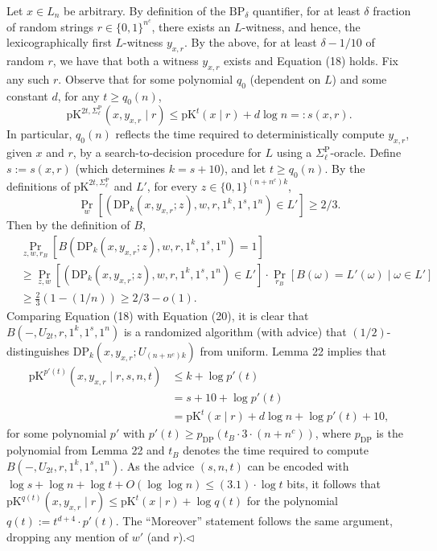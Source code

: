 \documentclass[10pt,a4paper]{article}
\begin{document}
Let $x\in L_n$ be arbitrary. By definition of the $\mathrm{BP}_\delta$ quantifier, for at least $\delta$ fraction of random strings $r\in\{0,1\}^{n^c}$, there exists an $L$-witness, and hence, the lexicographically first $L$-witness $y_{x,r}$. By the above, for at least $\delta-1/10$ of random $r$, we have that both a witness $y_{x,r}$ exists and Equation (18) holds. Fix any such $r$.
Observe that for some polynomial $q_0$ (dependent on $L$) and some constant $d$, for any $t\geq q_0(n)$,
\[\mathrm{pK}^{2t,\Sigma_\ell^{\mathrm P}}(x,y_{x,r}\mid r)\leq\mathrm{pK}^t(x\mid r)+d\log n=:s(x,r).\tag{19}\]
In particular, $q_0(n)$ reflects the time required to deterministically compute $y_{x,r}$, given $x$ and $r$, by a search-to-decision procedure for $L$ using a $\Sigma_\ell^{\mathrm P}$-oracle.
Define $s:=s(x,r)$ (which determines $k=s+10$), and let $t\geq q_0(n)$. By the definitions of $\mathrm{pK}^{2t,\Sigma_\ell^{\mathrm P}}$ and $L'$, for every $z\in\{0,1\}^{(n+n^c)k}$,
\[\Pr_w[(\mathrm{DP}_k(x,y_{x,r};z),w,r,1^k,1^s,1^n)\in L']\geq2/3.\]
Then by the definition of $B$,
\begin{align*}
&\Pr_{z,w,r_B}[B(\mathrm{DP}_k(x,y_{x,r};z),w,r,1^k,1^s,1^n)=1]\\
&\geq\Pr_{z,w}[(\mathrm{DP}_k(x,y_{x,r};z),w,r,1^k,1^s,1^n)\in L']\cdot\Pr_{r_B}[B(\omega)=L'(\omega)\mid\omega\in L']\\
&\geq\frac23(1-(1/n))\geq2/3-o(1).\tag{20}
\end{align*}
Comparing Equation (18) with Equation (20), it is clear that $B(-,U_{2t},r,1^k,1^s,1^n)$ is a randomized algorithm (with advice) that $(1/2)$-distinguishes $\mathrm{DP}_k(x,y_{x,r};U_{(n+n^c)k})$ from uniform. Lemma 22 implies that
\begin{align*}
\mathrm{pK}^{p'(t)}(x,y_{x,r}\mid r,s,n,t)&\leq k+\log p'(t)\tag{21}\\
&=s+10+\log p'(t)\\
&=\mathrm{pK}^t(x\mid r)+d\log n+\log p'(t)+10,
\end{align*}
for some polynomial $p'$ with $p'(t)\geq p_{\mathrm{DP}}(t_B\cdot3\cdot(n+n^c))$, where $p_{\mathrm{DP}}$ is the polynomial from Lemma 22 and $t_B$ denotes the time required to compute $B(-,U_{2t},r,1^k,1^s,1^n)$. As the advice $(s,n,t)$ can be encoded with $\log s+\log n+\log t+O(\log\log n)\leq(3.1)\cdot\log t$ bits, it follows that $\mathrm{pK}^{q(t)}(x,y_{x,r}\mid r)\leq\mathrm{pK}^t(x\mid r)+\log q(t)$ for the polynomial $q(t):=t^{d+4}\cdot p'(t)$.
The ``Moreover'' statement follows the same argument, dropping any mention of $w'$ (and $r$).\hfill$\triangleleft$
\end{document}
